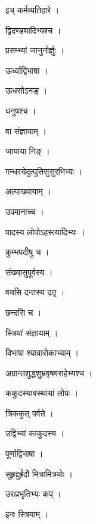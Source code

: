 \documentclass[10pt, openany]{book}
\begin{document}
\noindent इच् कर्मव्यतिहारे ।

\noindent द्विदण्ड्यादिभ्यश्च ।

\noindent प्रसम्भ्यां जानुनोर्ज्ञुः ।

\noindent ऊर्ध्वाद्विभाषा ।

\noindent ऊधसोऽनङ् ।

\noindent धनुषश्च ।

\noindent वा संज्ञायाम् ।

\noindent जायाया निङ् ।

\noindent गन्धस्येदुत्पूतिसुसुरभिभ्यः ।

\noindent अल्पाख्यायाम् ।

\noindent उपमानाच्च ।

\noindent पादस्य लोपोऽहस्त्यादिभ्यः ।

\noindent कुम्भपदीषु च ।

\noindent संख्यासुपूर्वस्य ।

\noindent वयसि दन्तस्य दतृ ।

\noindent छन्दसि च ।

\noindent स्त्रियां संज्ञायाम् ।

\noindent विभाषा श्यावारोकाभ्याम् ।

\noindent अग्रान्तशुद्धशुभ्रवृषवराहेभ्यश्च ।

\noindent ककुदस्यावस्थायां लोपः ।

\noindent त्रिककुत् पर्वते ।

\noindent उद्विभ्यां काकुदस्य ।

\noindent पूर्णाद्विभाषा ।

\noindent सुहृद्दुर्हृदौ मित्रामित्रयोः ।

\noindent उरःप्रभृतिभ्यः कप् ।

\noindent इनः स्त्रियाम् ।
\end{document}
